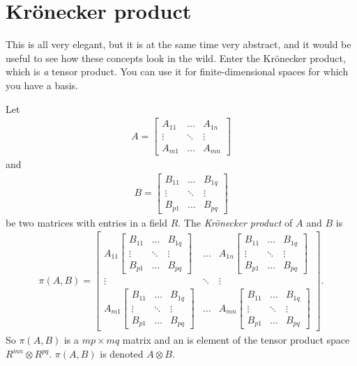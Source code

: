 \documentclass[english, 12pt]{article}
\begin{document}
\section{Krönecker product}%
\label{sec:krönecker_product}

This is all very elegant, but it is at the same time very abstract, and it would be useful to see how these concepts look in the wild.
Enter the Krönecker product, which is \emph{a} tensor product.
You can use it for finite-dimensional spaces for which you have a basis.
\begin{definition}
	Let
	\begin{align*}
		A =
		\begin{bmatrix}
			A_{11} & \dots & A_{1n}\\
			\vdots & \ddots & \vdots\\
			A_{m1} & \dots & A_{mn}
		\end{bmatrix}
	\end{align*}
	and
	\begin{align*}
		B =
		\begin{bmatrix}
			B_{11} & \dots & B_{1q}\\
			\vdots & \ddots & \vdots\\
			B_{p1} & \dots & B_{pq}
		\end{bmatrix}
	\end{align*}
	be two matrices with entries in a field $R$.
	The \emph{Krönecker product} of $A$ and $B$ is
	\begin{align*}
		\pi(A, B) =
		\begin{bmatrix}
			A_{11}
			\begin{bmatrix}
				B_{11} & \dots & B_{1q}\\
				\vdots & \ddots & \vdots\\
				B_{p1} & \dots & B_{pq}
			\end{bmatrix}
			& \dots &
			A_{1n}
			\begin{bmatrix}
				B_{11} & \dots & B_{1q}\\
				\vdots & \ddots & \vdots\\
				B_{p1} & \dots & B_{pq}
			\end{bmatrix}\\
			\vdots & \ddots & \vdots\\
			A_{m1}
			\begin{bmatrix}
				B_{11} & \dots & B_{1q}\\
				\vdots & \ddots & \vdots\\
				B_{p1} & \dots & B_{pq}
			\end{bmatrix}
			& \dots &
			A_{mn}
			\begin{bmatrix}
				B_{11} & \dots & B_{1q}\\
				\vdots & \ddots & \vdots\\
				B_{p1} & \dots & B_{pq}
			\end{bmatrix}
		\end{bmatrix}.
	\end{align*}
	So $\pi(A, B)$ is a $mp \times mq$ matrix and an is element of the tensor product space $R^{mn} \otimes R^{pq}$.
	$\pi(A, B)$ is denoted $A \otimes B$.
\end{definition}
\end{document}
